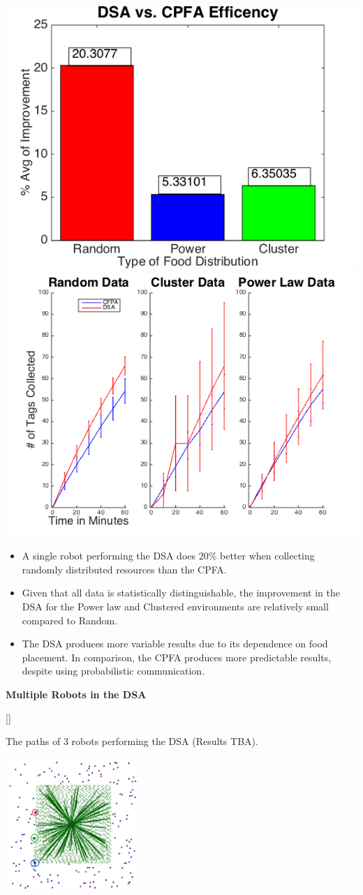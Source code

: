 \documentclass[a0paper,portrait,colspacing]{baposter}
\begin{document}
\begin{poster}
{%
\includegraphics[width=0.35\linewidth]{CPFAvsDSABar.png}
\hspace{25pt}\includegraphics[width=0.5\linewidth]{CPFAvsDSALine.png}\par
{}
\begin{itemize}
\item A single robot performing the DSA does $20\%$ better when collecting randomly distributed resources than the CPFA. 
\item Given that all data is statistically distinguishable, the improvement in the DSA for the Power law and Clustered environments are relatively small compared to Random.
\item The DSA produces more variable results due to its dependence on food placement. In comparison, the CPFA produces more predictable results, despite using probabilistic communication.
\end{itemize}
\textbf{Multiple Robots in the DSA}\vspace{-1em}

[\FBwidth]
{\caption{The paths of 3 robots performing the DSA (Results TBA).}}
{\includegraphics[width=5cm]{3RobotsDSA.png}}
}

\end{poster}
\end{document}

